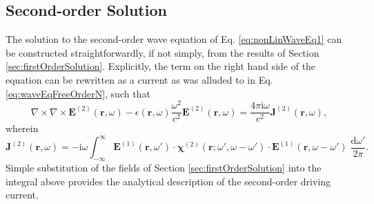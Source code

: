 \documentclass{article}
\begin{document}
\subsection{Second-order Solution}

The solution to the second-order wave equation of Eq. \eqref{eq:nonLinWaveEq1} can be constructed straightforwardly, if not simply, from the results of Section \ref{sec:firstOrderSolution}. Explicitly, the term on the right hand side of the equation can be rewritten as a current as was alluded to in Eq. \eqref{eq:waveEqFreeOrderN}, such that
\begin{equation}
\nabla\times\nabla\times\mathbf{E}^{(2)}(\mathbf{r},\omega) - \epsilon(\mathbf{r},\omega)\frac{\omega^2}{c^2}\mathbf{E}^{(2)}(\mathbf{r},\omega) = \frac{4\pi\mathrm{i}\omega}{c^2}\mathbf{J}^{(2)}(\mathbf{r},\omega),
\end{equation}
wherein
\begin{equation}
\mathbf{J}^{(2)}(\mathbf{r},\omega) = -\mathrm{i}\omega\int_{-\infty}^\infty\mathbf{E}^{(1)}(\mathbf{r},\omega')\cdot\bm{\chi}^{(2)}(\mathbf{r};\omega',\omega - \omega')\cdot\mathbf{E}^{(1)}(\mathbf{r},\omega - \omega')\;\frac{\mathrm{d}\omega'}{2\pi}.
\end{equation}
Simple substitution of the fields of Section \ref{sec:firstOrderSolution} into the integral above provides the analytical description of the second-order driving current. 
\end{document}
